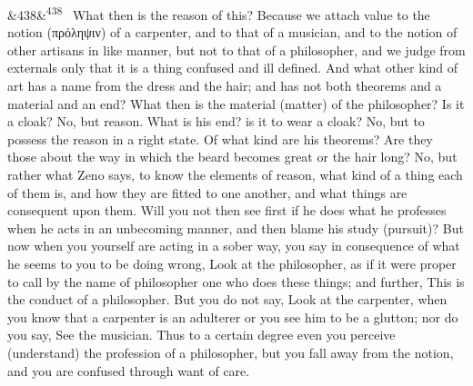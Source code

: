 \documentclass[12pt]{article}
\newcommand{\para}[1][]{\par\noindent\ifx&#1&\else\textsuperscript{\footnotesize #1}~\fi}
\begin{document}
\para[438] What then is the reason of this? Because we attach value to the notion (πρόληψιν) of a carpenter, and to that of a musician, and to the notion of other artisans in like manner, but not to that of a philosopher, and we judge from externals only that it is a thing confused and ill defined. And what other kind of art has a name from the dress and the hair; and has not both theorems and a material and an end? What then is the material (matter) of the philosopher? Is it a cloak? No, but reason. What is his end? is it to wear a cloak? No, but to possess the reason in a right state. Of what kind are his theorems? Are they those about the way in which the beard becomes great or the hair long? No, but rather what Zeno says, to know the elements of reason, what kind of a thing each of them is, and how they are fitted to one another, and what things are consequent upon them. Will you not then see first if he does what he professes when he acts in an unbecoming manner, and then blame his study (pursuit)? But now when you yourself are acting in a sober way, you say in consequence of what he seems to you to be doing wrong, Look at the philosopher, as if it were proper to call by the name of philosopher one who does these things; and further, This is the conduct of a philosopher. But you do not say, Look at the carpenter, when you know that a carpenter is an adulterer or you see him to be a glutton; nor do you say, See the musician. Thus to a certain degree even you perceive (understand) the profession of a philosopher, but you fall away from the notion, and you are confused through want of care.
\end{document}
